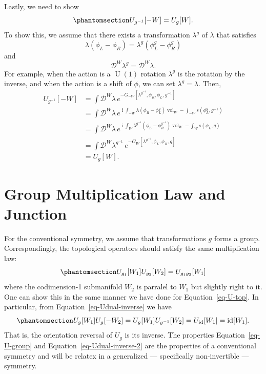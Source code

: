 \documentclass[
  letterpaper,
  DIV=11,
  numbers=noendperiod]{scrreport}
\DeclareMathOperator{\vol}{vol}
\DeclareMathOperator{\U}{U}
\DeclareMathOperator{\imunit}{i}
\DeclareMathOperator{\id}{id}
\begin{document}
Lastly, we need to show
\begin{equation}\phantomsection\label{eq-Udual-inverse}{ U_{g^{-1}}[-W] = U_g[W].
}\end{equation} To show this, we assume that there exists a
transformation \(\lambda^g\) of \(\lambda\) that satisfies
\[ \lambda(\phi_L-\phi_R) = \lambda^{g}(\phi_L^{g}-\phi_R^{g})
\] and \[ \mathcal{D}^W\lambda^g = \mathcal{D}^W\lambda. 
\] For example, when the action is a \(\U(1)\) rotation \(\lambda^g\) is
the rotation by the inverse, and when the action is a shift of \(\phi\),
we can set \(\lambda^g = \lambda\). Then, \[
\begin{split}
U_{g^{-1}}[-W] &= \int\mathcal{D}^W \lambda \, e^{-G_{-W}[\lambda^{g^{-1}},\phi_R,\phi_L,g^{-1}]}\\
&= \int\mathcal{D}^W \lambda \, e^{\imunit\int_{-W}\lambda(\phi_R-\phi_L^{g})\vol_W - \int_{-W}s(\phi_L^{g},g^{-1})}\\
&= \int\mathcal{D}^W \lambda \, e^{\imunit\int_{W}\lambda^{g^{-1}}(\phi_L-\phi_R^{g^{-1}})\vol_W - \int_{W}s(\phi_L,g)}\\
&= \int\mathcal{D}^W \lambda^{g^{-1}} \, e^{-G_W[\lambda^{g^{-1}},\phi_L,\phi_R,g]}\\
&= U_g[W].
\end{split}
\]

\section{Group Multiplication Law and
Junction}\label{group-multiplication-law-and-junction}

For the conventional symmetry, we assume that transformations \(g\)
forms a group. Correspondingly, the topological operators should satisfy
the same multiplication law:
\begin{equation}\phantomsection\label{eq-U-group}{
U_{g_1}[W_1] U_{g_2}[W_2] = U_{g_1g_2}[W_1]
}\end{equation} where the codimension-1 submanifold \(W_2\) is parralel
to \(W_1\) but slightly right to it. One can show this in the same
manner we have done for Equation~\ref{eq-U-top}. In particular, from
Equation~\ref{eq-Udual-inverse} we have
\begin{equation}\phantomsection\label{eq-Udual-inverse-2}{ U_g[W_1] U_g[-W_2] = U_g[W_1] U_{g^{-1}}[W_2] = U_{\id}[W_1] = \id[W_1].
}\end{equation} That is, the orientation reversal of \(U_g\) is its
inverse. The properties Equation~\ref{eq-U-group} and
Equation~\ref{eq-Udual-inverse-2} are the properties of a conventional
symmetry and will be relatex in a generalized --- specifically
non-invertible --- symmetry.
\end{document}
